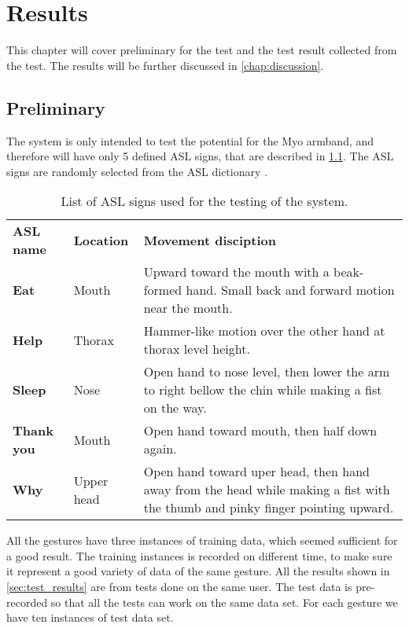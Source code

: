 \chapter{Results}
\label{chap:results}
This chapter will cover preliminary for the test and the test result collected from the test. The results will be further discussed in \cref{chap:discussion}.

\section{Preliminary}
The system is only intended to test the potential for the Myo armband, and therefore will have only 5 defined ASL signs, that are described in \cref{table:ASL_signs}. The ASL signs are randomly selected from the ASL dictionary \cite{ASL_dict}. 

\begin{table}[ht!]
\centering
    \begin{tabular}{ | l | p{4cm} | p{7cm}|}
        \hline
        \textbf{ASL name} & \textbf{Location} & \textbf{Movement disciption} \\ \Xhline{4\arrayrulewidth}
        
        \textbf{Eat} & Mouth & Upward toward the mouth with a beak-formed hand. Small back and forward motion near the mouth. \\ \hline
        
        \textbf{Help} & Thorax & Hammer-like motion over the other hand at thorax level height.\\ \hline
        
        \textbf{Sleep} & Nose & Open hand to nose level, then lower the arm to right bellow the chin while making a fist on the way.\\ \hline
        
        \textbf{Thank you} & Mouth & Open hand toward mouth, then half down again.\\ \hline
        
        \textbf{Why} & Upper head & Open hand toward uper head, then hand away from the head while making a fist with the thumb and pinky finger pointing upward.\\ \hline
    \end{tabular}
    \caption[Defines ASL signs]{List of ASL signs used for the testing of the system.}
    \label{table:ASL_signs}
\end{table}

All the gestures have three instances of training data, which seemed sufficient for a good result. The training instances is recorded on different time, to make sure it represent a good variety of data of the same gesture. All the results shown in \cref{sec:test_results} are from tests done on the same user. The test data is pre-recorded so that all the tests can work on the same data set. For each gesture we have ten instances of test data set.

